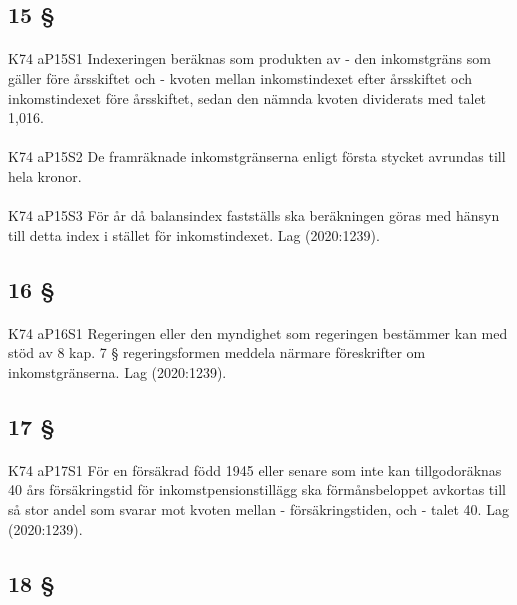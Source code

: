 \documentclass[a4paper,notitlepage,openany,10pt]{book}
\begin{document}
\subsection*{15 §}
\paragraph*{}
{\tiny K74 aP15S1}
Indexeringen beräknas som produkten av
\newline - den inkomstgräns som gäller före årsskiftet och
\newline - kvoten mellan inkomstindexet efter årsskiftet och inkomstindexet före årsskiftet, sedan den nämnda kvoten dividerats med talet 1,016.
\paragraph*{}
{\tiny K74 aP15S2}
De framräknade inkomstgränserna enligt första stycket avrundas till hela kronor.
\paragraph*{}
{\tiny K74 aP15S3}
För år då balansindex fastställs ska beräkningen göras med hänsyn till detta index i stället för inkomstindexet.
Lag (2020:1239).
\subsection*{16 §}
\paragraph*{}
{\tiny K74 aP16S1}
Regeringen eller den myndighet som regeringen bestämmer kan med stöd av 8 kap. 7 § regeringsformen meddela närmare föreskrifter om inkomstgränserna.
Lag (2020:1239).
\subsection*{17 §}
\paragraph*{}
{\tiny K74 aP17S1}
För en försäkrad född 1945 eller senare som inte kan tillgodoräknas 40 års försäkringstid för inkomstpensionstillägg ska förmånsbeloppet avkortas till så stor andel som svarar mot kvoten mellan
\newline - försäkringstiden, och
\newline - talet 40.
Lag (2020:1239).
\subsection*{18 §}
\end{document}
